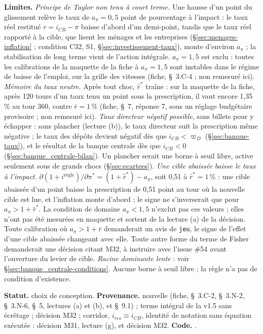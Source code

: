 \documentclass[11pt,a4paper]{article}
\newcommand{\limites}{\par\noindent\textbf{Limites.} }
\newcommand{\code}[1]{\texttt{\detokenize{#1}}}
\newcommand{\tracabilite}[3]{\par\smallskip\noindent\textbf{Statut.} #1. \textbf{Provenance.} #2. \textbf{Code.} \code{#3}.}
\begin{document}
\begin{proposee}
\begin{lecture}
\limites \emph{Principe de Taylor non tenu à court terme.} Une hausse d'un point du glissement relève le taux de $a_\pi = 0{,}5$ point de pourcentage à l'impact : le taux réel restitué $r = i_{\mathit{CB}} - \pi$ baisse d'abord d'un demi-point, tandis que le taux réel rapporté à la cible, que lisent les ménages et les entreprises (\S\ref{sec:menages-inflation} ; condition C32, S1, \S\ref{sec:investissement-taux}), monte d'environ $a_\pi$ ; la stabilisation de long terme vient de l'action intégrale. $a_\pi = 1{,}5$ est exclu : toutes les calibrations de la maquette de la fiche à $a_\pi = 1{,}5$ sont instables dans le régime de baisse de l'emploi, sur la grille des vitesses (fiche, \S~3.C-4 ; non remesuré ici). \emph{Mémoire du taux neutre.} Après tout choc, $\hat r^\ast$ traîne : sur la maquette de la fiche, après 120 tours d'un taux tenu un point sous la prescription, il vaut encore 1,35\,\% au tour 360, contre $\bar r = 1\,\%$ (fiche, \S~7, réponse 7, sous un réglage budgétaire provisoire ; non remesuré ici). \emph{Taux directeur négatif possible}, sans billets pour y échapper : sans plancher (lecture (b)), le taux directeur suit la prescription même négative ; le taux des dépôts devient négatif dès que $i_{\mathit{CB}} < \varpi_D$ (\S\ref{sec:banque-taux}), et le résultat de la banque centrale dès que $i_{\mathit{CB}} < 0$ (\S\ref{sec:banque_centrale-bilan}). Un plancher serait une borne à seuil libre, active seulement sous de grands chocs (\S\ref{sec:ecartees}). \emph{Une cible abaissée baisse le taux à l'impact.} $\partial(1 + i^{\text{règle}})/\partial\pi^\ast = (1 + \hat r^\ast) - a_\pi$, soit 0,51 à $\hat r^\ast = 1\,\%$ : une cible abaissée d'un point baisse la prescription de 0,51 point au tour où la nouvelle cible est lue, et l'inflation monte d'abord ; le signe ne s'inverserait que pour $a_\pi > 1 + \hat r^\ast$. La condition de domaine $a_\pi < 1{,}5$ n'exclut pas ces valeurs ; elles n'ont pas été mesurées en maquette et sortent de la lecture (a) de la décision. Toute calibration où $a_\pi > 1 + \bar r$ demanderait un avis de \texttt{jeu}, le signe de l'effet d'une cible abaissée changeant avec elle. Toute autre forme du terme de Fisher demanderait une décision citant M32, à instruire avec l'issue \#54 avant l'ouverture du levier de cible. \emph{Racine dominante lente} : voir \S\ref{sec:banque_centrale-conditions}. Aucune borne à seuil libre ; la règle n'a pas de condition d'existence.
\tracabilite{choix de conception}{nouvelle (fiche, \S~3.C-2, \S~3.N-2, \S~3.N-6, \S~5, lectures (a) et (b), et \S~9.1) ; terme intégral de la v1.5 sans écrêtage ; décision M32 ; corridor, $i_{\mathit{res}} \equiv i_{\mathit{CB}}$, identité de notation sans équation exécutée : décision M31, lecture (g), et décision M32}{nations.blocs.banque_centrale}
\end{lecture}
\end{proposee}
\end{document}
